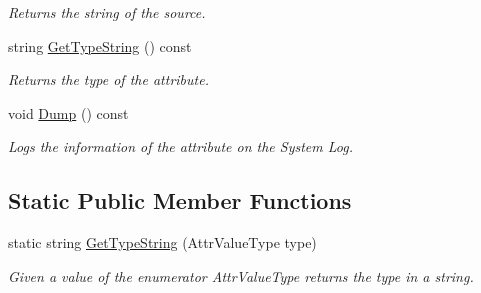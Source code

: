 \begin{DoxyCompactItemize}
\begin{DoxyCompactList}\small\item\em Returns the string of the source. \end{DoxyCompactList}\item 
\hypertarget{class_common_1_1_attribute_a0216c228ccddf6c48b263a7bf85a22f5}{string \hyperlink{class_common_1_1_attribute_a0216c228ccddf6c48b263a7bf85a22f5}{Get\-Type\-String} () const }\label{class_common_1_1_attribute_a0216c228ccddf6c48b263a7bf85a22f5}

\begin{DoxyCompactList}\small\item\em Returns the type of the attribute. \end{DoxyCompactList}\item 
\hypertarget{class_common_1_1_attribute_a2e324783d3f8c637ba014bb31f57a0f3}{void \hyperlink{class_common_1_1_attribute_a2e324783d3f8c637ba014bb31f57a0f3}{Dump} () const }\label{class_common_1_1_attribute_a2e324783d3f8c637ba014bb31f57a0f3}

\begin{DoxyCompactList}\small\item\em Logs the information of the attribute on the System Log. \end{DoxyCompactList}\end{DoxyCompactItemize}
\subsection*{Static Public Member Functions}
\begin{DoxyCompactItemize}
\item 
\hypertarget{class_common_1_1_attribute_a6eb5558c76b0ee62bda3316527a4efe1}{static string \hyperlink{class_common_1_1_attribute_a6eb5558c76b0ee62bda3316527a4efe1}{Get\-Type\-String} (Attr\-Value\-Type type)}\label{class_common_1_1_attribute_a6eb5558c76b0ee62bda3316527a4efe1}

\begin{DoxyCompactList}\small\item\em Given a value of the enumerator Attr\-Value\-Type returns the type in a string. \end{DoxyCompactList}\end{DoxyCompactItemize}
